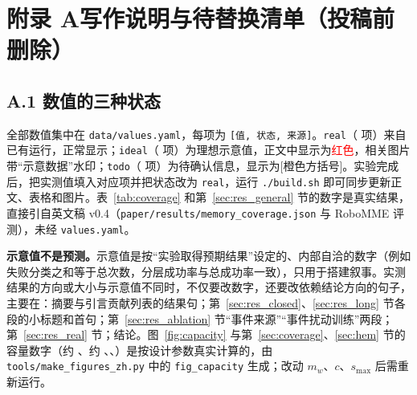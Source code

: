 \clearpage
\appendix
\section*{附录 A\quad 写作说明与待替换清单（投稿前删除）}
\small

\subsection*{A.1 数值的三种状态}
全部数值集中在 \texttt{data/values.yaml}，每项为 \texttt{[值, 状态, 来源]}。\texttt{real}（\NumReal{} 项）来自已有运行，正常显示；\texttt{ideal}（\NumIdeal{} 项）为理想示意值，正文中显示为\textcolor{red}{红色}，相关图片带“示意数据”水印；\texttt{todo}（\NumTodo{} 项）为待确认信息，显示为\textcolor{orange!85!black}{[橙色方括号]}。实验完成后，把实测值填入对应项并把状态改为 \texttt{real}，运行 \texttt{./build.sh} 即可同步更新正文、表格和图片。表~\ref{tab:coverage} 和第~\ref{sec:res_general} 节的数字是真实结果，直接引自英文稿 v0.4（\texttt{paper/results/memory\_coverage.json} 与 RoboMME 评测），未经 \texttt{values.yaml}。

\textbf{示意值不是预测。}示意值是按“实验取得预期结果”设定的、内部自洽的数字（例如失败分类之和等于总次数，分层成功率与总成功率一致），只用于搭建叙事。实测结果的方向或大小与示意值不同时，不仅要改数字，还要改依赖结论方向的句子，主要在：摘要与引言贡献列表的结果句；第~\ref{sec:res_closed}、\ref{sec:res_long} 节各段的小标题和首句；第~\ref{sec:res_ablation} 节“事件来源”“事件扰动训练”两段；第~\ref{sec:res_real} 节；结论。图~\ref{fig:capacity} 与第~\ref{sec:coverage}、\ref{sec:hem} 节的容量数字（约 、约 、、）是按设计参数真实计算的，由 \texttt{tools/make\_figures\_zh.py} 中的 \texttt{fig\_capacity} 生成；改动 $m_w$、$c$、$s_{\max}$ 后需重新运行。


